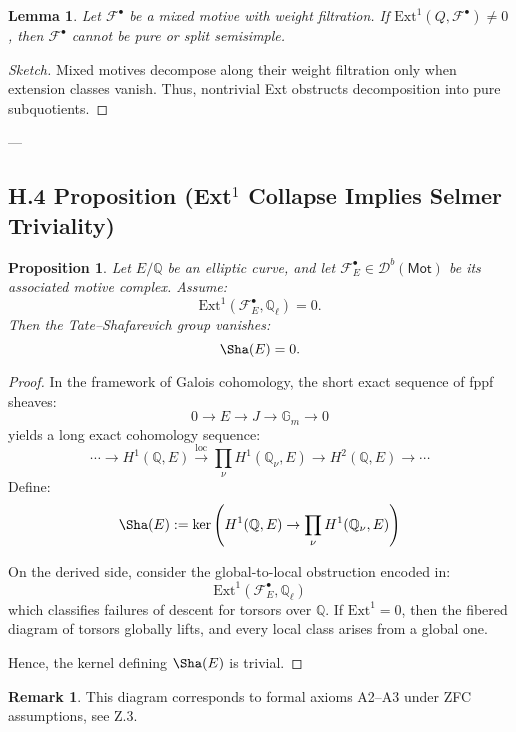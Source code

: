 \documentclass[11pt]{article}
\newtheorem{lemma}[theorem]{Lemma}
\newtheorem{proposition}[theorem]{Proposition}
\theoremstyle{definition}
\newtheorem{remark}[theorem]{Remark}
\begin{document}
\begin{lemma}
Let \( \mathcal{F}^\bullet \) be a mixed motive with weight filtration.  
If \( \mathrm{Ext}^1(Q, \mathcal{F}^\bullet) \neq 0 \), then \( \mathcal{F}^\bullet \) cannot be pure or split semisimple.
\end{lemma}

\begin{proof}[Sketch]
Mixed motives decompose along their weight filtration only when extension classes vanish.  
Thus, nontrivial Ext obstructs decomposition into pure subquotients.
\end{proof}

---

\subsection*{H.4 Proposition (Ext$^1$ Collapse Implies Selmer Triviality)}

\begin{proposition}
Let \( E/\mathbb{Q} \) be an elliptic curve, and let \( \mathcal{F}_E^\bullet \in \mathcal{D}^b(\mathsf{Mot}) \) be its associated motive complex.  
Assume:
\[
\mathrm{Ext}^1(\mathcal{F}_E^\bullet, \mathbb{Q}_\ell) = 0.
\]
Then the Tate–Shafarevich group vanishes:
\[
\Sha(E) = 0.
\]
\end{proposition}

\begin{proof}
In the framework of Galois cohomology, the short exact sequence of fppf sheaves:
\[
0 \to E \to J \to \mathbb{G}_m \to 0
\]
yields a long exact cohomology sequence:
\[
\cdots \to H^1(\mathbb{Q}, E) \xrightarrow{\mathrm{loc}} \prod_\nu H^1(\mathbb{Q}_\nu, E) \to H^2(\mathbb{Q}, E) \to \cdots
\]
Define:
\[
\Sha(E) := \ker \left( H^1(\mathbb{Q}, E) \to \prod_\nu H^1(\mathbb{Q}_\nu, E) \right)
\]

On the derived side, consider the global-to-local obstruction encoded in:
\[
\mathrm{Ext}^1(\mathcal{F}_E^\bullet, \mathbb{Q}_\ell)
\]
which classifies failures of descent for torsors over \( \mathbb{Q} \).  
If \( \mathrm{Ext}^1 = 0 \), then the fibered diagram of torsors globally lifts, and every local class arises from a global one.

Hence, the kernel defining \( \Sha(E) \) is trivial.
\end{proof}

\begin{remark}
This diagram corresponds to formal axioms A2–A3 under ZFC assumptions, see Z.3.
\end{remark}
\end{document}
